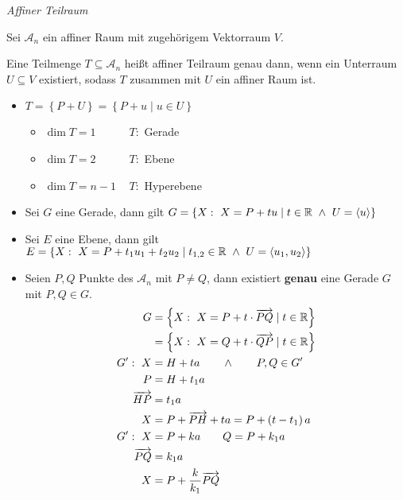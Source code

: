 \begin{mydef}\textit{Affiner Teilraum}\medskip

    Sei $\mathcal{A}_n$ ein affiner Raum mit zugehörigem Vektorraum $V$.

    Eine Teilmenge $T \subseteq \mathcal{A}_n$ heißt affiner Teilraum genau dann, wenn ein Unterraum $U \subseteq V$ existiert, sodass $T$ zusammen mit $U$ ein affiner Raum ist.
    \begin{itemize}
        \item $T = \left\{ P + U \right\} = \left\{ P + u \mid u \in U \right\}$
            \begin{itemize}
                \item $\dim T = 1 \qquad\quad T:$ Gerade
                \item $\dim T = 2 \qquad\quad T:$ Ebene
                \item $\dim T = n-1 \quad\, T:$ Hyperebene
            \end{itemize}
        \item Sei $G$ eine Gerade, dann gilt $G = \left\{ X:\ X = P + t u \mid t \in \mathbb{R} \ \wedge \ U = \left\langle u \right\rangle \right\}$
        \item Sei $E$ eine Ebene, dann gilt $E = \left\{ X:\ X = P + t_1 u_1 + t_2 u_2 \mid t_{1,2} \in \mathbb{R} \ \wedge \ U = \left\langle u_1, u_2 \right\rangle \right\}$
        \item Seien $P,Q$ Punkte des $\mathcal{A}_n$ mit $P \neq Q$, dann existiert \textbf{genau} eine Gerade $G$ mit $P,Q \in G$.
            \begin{align*}
                G & = \left\{ X:\ X = P + t \cdot \overrightarrow{PQ} \mid t \in \mathbb{R} \right\}\\
                & = \left\{ X:\ X = Q + t \cdot \overrightarrow{QP} \mid t \in \mathbb{R} \right\}\\
                G' :\ X & = H + t a \qquad \wedge \qquad P,Q \in G'\\
                P & = H + t_1 a\\
                \overrightarrow{HP} & = t_1 a\\
                X & = P + \overrightarrow{PH} + t a = P + \left( t - t_1 \right) a\\
                G' :\ X & = P + k a \qquad Q = P + k_1 a\\
                \overrightarrow{PQ} & = k_1 a\\
                X & = P + \frac{k}{k_1} \overrightarrow{PQ}
            \end{align*}
    \end{itemize}
\end{mydef}

